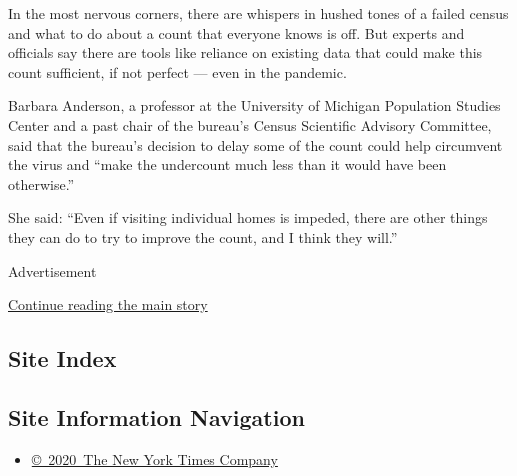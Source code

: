 In the most nervous corners, there are whispers in hushed tones of a
failed census and what to do about a count that everyone knows is off.
But experts and officials say there are tools like reliance on existing
data that could make this count sufficient, if not perfect --- even in
the pandemic.

Barbara Anderson, a professor at the University of Michigan Population
Studies Center and a past chair of the bureau's Census Scientific
Advisory Committee, said that the bureau's decision to delay some of the
count could help circumvent the virus and ``make the undercount much
less than it would have been otherwise.''

She said: ``Even if visiting individual homes is impeded, there are
other things they can do to try to improve the count, and I think they
will.''

Advertisement

\protect\hyperlink{after-bottom}{Continue reading the main story}

\hypertarget{site-index}{%
\subsection{Site Index}\label{site-index}}

\hypertarget{site-information-navigation}{%
\subsection{Site Information
Navigation}\label{site-information-navigation}}

\begin{itemize}
\tightlist
\item
  \href{https://help.nytimes.com/hc/en-us/articles/115014792127-Copyright-notice}{©~2020~The
  New York Times Company}
\end{itemize}

